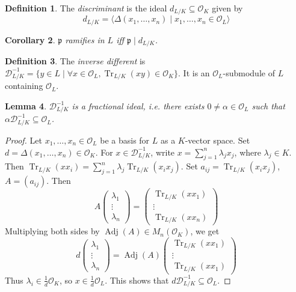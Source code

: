 \documentclass[11pt]{article}
\theoremstyle{definition}
\newtheorem{definition}{Definition}[subsection]
\theoremstyle{plain}
\newtheorem{lemma}[definition]{Lemma}
\newtheorem{corollary}[definition]{Corollary}
\theoremstyle{remark}
\DeclareMathOperator{\Adj}{Adj}
\DeclareMathOperator{\Tr}{Tr}
\newcommand{\cD}{\mathcal{D}}
\newcommand{\cO}{\mathcal{O}}
\newcommand{\fp}{\mathfrak{p}}
\begin{document}
\begin{definition}\label{def:12_3}
    The \emph{discriminant} is the ideal $d_{L / K} \subseteq \cO_K$ given by
    \begin{equation*}
        d_{L/K} = \langle \Delta(x_1, \ldots, x_n) \mid x_1, \ldots, x_n \in \cO_L \rangle
    \end{equation*}
\end{definition}

\begin{corollary}\label{cor:12_4}
    $\fp$ ramifies in $L$ iff $\fp \mid d_{L/K}$.
\end{corollary}

\begin{definition}\label{def:12_5}
    The \emph{inverse different} is $\cD_{L/K}^{-1} = \{y \in L \mid \forall x \in \cO_L, \Tr_{L/K}(xy) \in \cO_K \}$. It is an $\cO_L$-submodule of $L$ containing $\cO_L$.
\end{definition}

\begin{lemma}\label{lem:12_6}
    $\cD_{L/K}^{-1}$ is a fractional ideal, i.e. there exists $0 \neq \alpha \in \cO_L$ such that $\alpha \cD_{L/K}^{-1} \subseteq \cO_L$.
\end{lemma}
\begin{proof}
    Let $x_1, \ldots, x_n \in \cO_L$ be a basis for $L$ as a $K$-vector space. Set $d = \Delta(x_1, \ldots, x_n) \in \cO_K$. For $x \in \cD_{L/K}^{-1}$, write $x = \sum_{j=1}^n \lambda_j x_j$, where $\lambda_j \in K$. Then $\Tr_{L/K}(x x_i) = \sum_{j=1}^n \lambda_j \Tr_{L/K}(x_i x_j)$. Set $a_{ij} = \Tr_{L/K}(x_i x_j)$, $A = (a_{ij})$. Then
    \begin{equation*}
        A
        \begin{pmatrix} \lambda_1 \\ \vdots \\ \lambda_n \end{pmatrix}
        =
        \begin{pmatrix} \Tr_{L/K}(x x_1) \\ \vdots \\ \Tr_{L/K}(x x_n) \end{pmatrix}
    \end{equation*}
    Multiplying both sides by $\Adj(A) \in M_n(\cO_K)$, we get
    \begin{equation*}
        d
        \begin{pmatrix} \lambda_1 \\ \vdots \\ \lambda_n \end{pmatrix}
        = \Adj(A)
        \begin{pmatrix} \Tr_{L/K}(x x_1) \\ \vdots \\ \Tr_{L/K}(x x_1) \end{pmatrix}
    \end{equation*}
    Thus $\lambda_i \in \frac{1}{d} \cO_K$, so $x \in \frac{1}{d} \cO_L$. This shows that $d \cD_{L/K}^{-1} \subseteq \cO_L$.
\end{proof}
\end{document}

